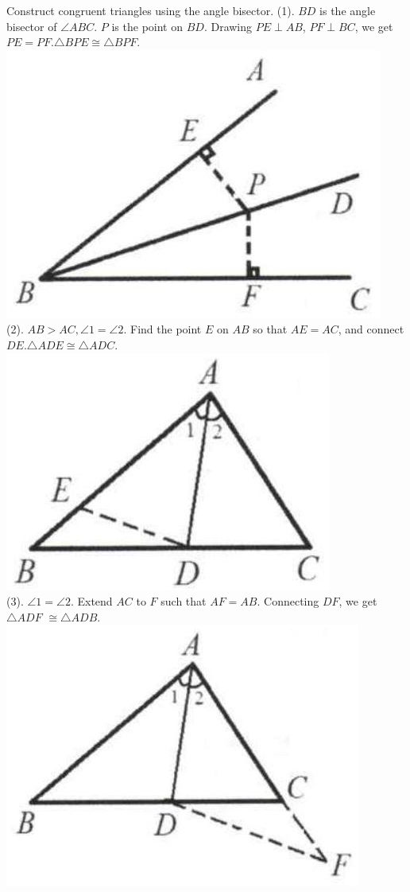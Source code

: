 \documentclass{article}
\begin{document}
Construct congruent triangles using the angle bisector.
(1). \(B D\) is the angle bisector of \(\angle A B C\). \(P\) is the point on \(B D\). Drawing \(P E \perp A B\), \(P F \perp B C\), we get \(P E=P F . \triangle B P E \cong \triangle B P F\).\\
\centering
\includegraphics[width=\textwidth]{images/054(1).jpg}\\
(2). \(A B>A C, \angle 1=\angle 2\). Find the point \(E\) on \(A B\) so that \(A E=A C\), and connect \(D E . \triangle A D E \cong \triangle A D C\).\\
\centering
\includegraphics[width=\textwidth]{images/054.jpg}\\
(3). \(\angle 1=\angle 2\). Extend \(A C\) to \(F\) such that \(A F=A B\). Connecting \(D F\), we get \(\triangle A D F\) \(\cong \triangle A D B\).\\
\centering
\includegraphics[width=\textwidth]{images/054(2).jpg}
\end{document}
